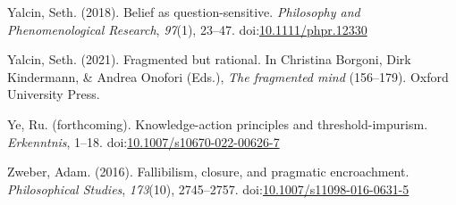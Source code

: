 \documentclass[
  10pt,
  letterpaper,
  twoside]{scrbook}
\newlength{\cslhangindent}
\newenvironment{CSLReferences}[2] %
 {\begin{list}{}{%
  \setlength{\itemindent}{0pt}
  \setlength{\leftmargin}{0pt}
  \setlength{\parsep}{0pt}
  \ifodd #1
   \setlength{\leftmargin}{\cslhangindent}
   \setlength{\itemindent}{-1\cslhangindent}
  \fi
  \setlength{\itemsep}{#2\baselineskip}}}
 {\end{list}}
\begin{document}
\begin{CSLReferences}{1}{0}
Yalcin, Seth. (2018). Belief as question-sensitive. \emph{Philosophy and
Phenomenological Research}, \emph{97}(1), 23--47.
doi:\href{https://doi.org/10.1111/phpr.12330}{10.1111/phpr.12330}

Yalcin, Seth. (2021). Fragmented but rational. In Christina Borgoni,
Dirk Kindermann, \& Andrea Onofori (Eds.), \emph{The fragmented mind}
(156--179). Oxford University Press.

Ye, Ru. (forthcoming). Knowledge-action principles and
threshold-impurism. \emph{Erkenntnis}, 1--18.
doi:\href{https://doi.org/10.1007/s10670-022-00626-7}{10.1007/s10670-022-00626-7}

Zweber, Adam. (2016). Fallibilism, closure, and pragmatic encroachment.
\emph{Philosophical Studies}, \emph{173}(10), 2745--2757.
doi:\href{https://doi.org/10.1007/s11098-016-0631-5}{10.1007/s11098-016-0631-5}

\end{CSLReferences}


\backmatter
\end{document}
